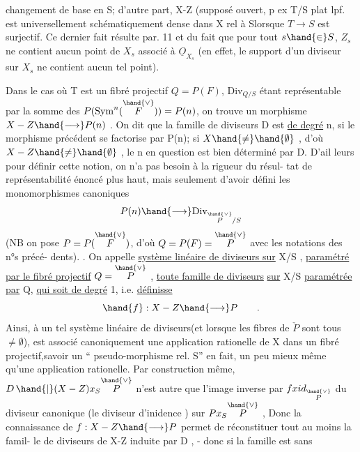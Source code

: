 changement de base en S; d'autre part, X-Z (supposé ouvert, p ex T/S plat lpf. est universellement
schématiquement dense dans X rel à Slorsque $T \to S$ est surjectif\unsure{)}. Ce dernier fait résulte  %
 par. 11 et du fait que pour tout $s \hand{\in} S$,
$Z_s$ ne contient aucun point de $X_s$ associé à $\underline{O}_{X_s}$ (en effet, le support d'un
diviseur  sur $X_s$ ne contient aucun tel point).

Dans le cas où T est un fibré projectif $Q=P(F)$, $\mathrm{Div}_{Q/S}$
étant représentable par la somme des $P(\mathrm{Sym}^n(\overset{\hand{\vee}}{F})) = P(n)$, on trouve
un morphisme $X-Z \hand{\longrightarrow} P(n)$ . On dit que la famille de diviseurs
D est \uline{de degré} n, si le morphisme précédent se factorise par P(n); si
$X \hand{\neq} \hand{\emptyset}$ , d'où $X-Z \hand{\neq} \hand{\emptyset}$ , le n en question est bien déterminé par D. D'ail%
leurs pour définir cette notion, on n'a pas besoin à la rigueur du résul-%
tat de représentabilité énoncé plus haut, mais seulement d'avoir défini
les monomorphismes canoniques
\[ P(n) \hand{\longrightarrow} \mathrm{Div}_{\overset{\hand{\vee}}{P}/S} \]
(NB on pose $P = P(\overset{\hand{\vee}}{F})$, d'où $Q = P(F) = \overset{\hand{\vee}}{P}$ avec les notations des n°s précé-%
dents). . On appelle \uline{système linéaire de diviseurs sur} X/S , \uline{paramétré
par le fibré projectif} $Q = \overset{\hand{\vee}}{P}$ , \uline{toute famille de diviseurs} \uline{sur} X/S
\uline{paramétrée par} Q, \uline{qui soit de degré} 1, i.e. \uline{définisse}
\[ \hand{f} : X-Z \hand{\longrightarrow} P \qquad . \]
Ainsi, à un tel système  linéaire de diviseurs(et lorsque les fibres de $\check{P}$ sont tous $\neq \emptyset$), est associé canoniquement
une application rationelle de X dans un fibré projectif,savoir un `` pseudo-morphisme rel. S'' \hand{(}en fait, un peu
mieux même qu'une application rationelle\hand{)}. Par construction même,
$D\,\hand{|}(X-Z)x_S\overset{\hand{\vee}}{P}$ n'est autre que l'image inverse par $f x id_{\overset{\hand{\vee}}{P}}$ du diviseur
canonique (le diviseur d'inidence ) sur $Px_S\overset{\hand{\vee}}{P}$ , Donc la connaissance
de $f: X-Z \hand{\longrightarrow} P$ permet de réconstituer  tout au moins la famil-%
le de diviseurs de X-Z induite par D , - donc si la famille est sans
